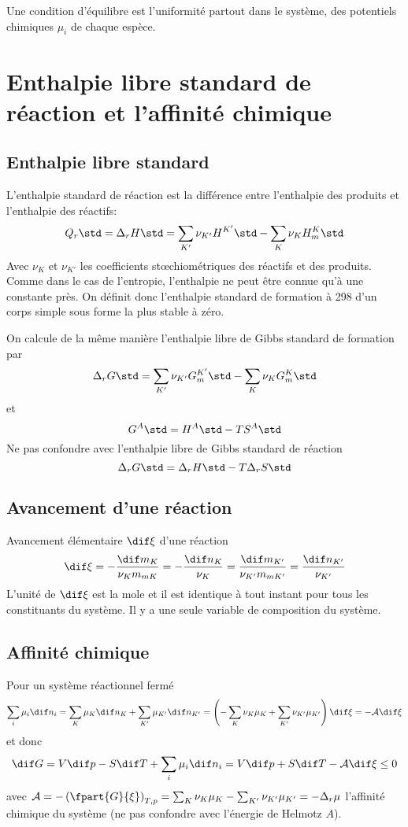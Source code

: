 Une condition d'équilibre est l'uniformité partout dans le système,
des potentiels chimiques $\mu_i$ de chaque espèce.

\section{Enthalpie libre standard de réaction et l'affinité chimique}
\subsection{Enthalpie libre standard}
L'enthalpie standard de réaction est la différence entre
l'enthalpie des produits et l'enthalpie des réactifs:
\[ Q_r\std = \Delta_rH\std =
\sum_{K'}\nu_{K'}{H^{K'}}\std-\sum_K\nu_K {H_m^K}\std \]
Avec $\nu_K$ et $\nu_{K'}$ les coefficients stœchiométriques
des réactifs et des produits.
Comme dans le cas de l'entropie,
l'enthalpie ne peut être connue qu'à une constante près.
On définit donc l'enthalpie standard de formation
à \si{298}{\kelvin}
d'un corps simple sous forme la plus stable à zéro.

On calcule de la même manière
l'enthalpie libre de Gibbs standard de formation par
\[ \Delta_rG\std = \sum_{K'}\nu_{K'}{G_m^{K'}}\std-\sum_K\nu_K {G_m^K}\std \]
et
\[ {G^A}\std = {H^A}\std-T{S^A}\std \]
Ne pas confondre avec l'enthalpie libre de Gibbs standard de réaction
\[ \Delta_rG\std = \Delta_rH\std-T\Delta_rS\std \]

\subsection{Avancement d'une réaction}
Avancement élémentaire $\dif\xi$ d'une réaction
\[ \dif\xi = -\frac{\dif m_K}{\nu_Km_{mK}} = -\frac{\dif n_K}{\nu_K} =
\frac{\dif m_{K'}}{\nu_{K'}m_{mK'}} = \frac{\dif n_{K'}}{\nu_{K'}} \]
L'unité de $\dif\xi$ est la mole et il est identique
à tout instant pour tous les constituants du système.
Il y a une seule variable de composition du système.

\subsection{Affinité chimique}
Pour un système réactionnel fermé
\[ \sum_i\mu_i\dif n_i = \sum_K\mu_K\dif n_K+\sum_{K'}\mu_{K'}\dif n_{K'} =
\left(-\sum_K\nu_K\mu_K+\sum_{K'}\nu_{K'}\mu_{K'}\right)\dif\xi =
-\mathcal{A}\dif\xi \]
et donc
\[ \dif G = V\dif p-S\dif T +\sum_i\mu_i\dif n_i
= V\dif p+S\dif T-\mathcal{A}\dif\xi \leq 0 \]
avec $\mathcal{A} = -\left(\fpart{G}{\xi}\right)_{T,p} =
\sum_K\nu_K\mu_K-\sum_{K'}\nu_{K'}\mu_{K'} = -\Delta_r \mu$
l'affinité chimique du système
(ne pas confondre avec l'énergie de Helmotz $A$).

